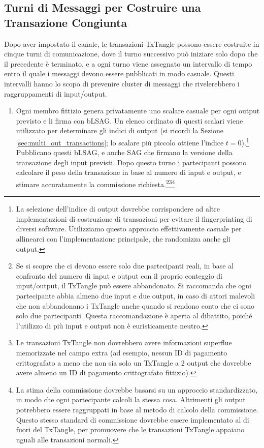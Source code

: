 \subsection{Turni di Messaggi per Costruire una Transazione Congiunta}
\label{subsec:message-rounds-txtangle}

Dopo aver impostato il canale, le transazioni TxTangle possono essere costruite in cinque turni di comunicazione, dove il turno successivo può iniziare solo dopo che il precedente è terminato, e a ogni turno viene assegnato un intervallo di tempo entro il quale i messaggi devono essere pubblicati in modo casuale. Questi intervalli hanno lo scopo di prevenire cluster di messaggi che rivelerebbero i raggruppamenti di input/output.
\begin{enumerate}
    \item Ogni membro fittizio genera privatamente uno scalare casuale per ogni output previsto e li firma con bLSAG. Un elenco ordinato di questi scalari viene utilizzato per determinare gli indici di output (si ricordi la Sezione \ref{sec:multi_out_transactions}; lo scalare più piccolo ottiene l'indice $t = 0$).\footnote{La selezione dell'indice di output dovrebbe corrispondere ad altre implementazioni di costruzione di transazioni per evitare il fingerprinting di diversi software. Utilizziamo questo approccio effettivamente casuale per allinearci con l'implementazione principale, che randomizza anche gli output.} Pubblicano questi bLSAG, e anche SAG che firmano la versione della transazione degli input previsti. Dopo questo turno i partecipanti possono calcolare il peso della transazione in base al numero di input e output, e stimare accuratamente la commissione richiesta.\footnote{Se si scopre che ci devono essere solo due partecipanti reali, in base al confronto del numero di input e output con il proprio conteggio di input/output, il TxTangle può essere abbandonato. Si raccomanda che ogni partecipante abbia almeno due input e due output, in caso di attori malevoli che non abbandonano i TxTangle anche quando si rendono conto che ci sono solo due partecipanti. Questa raccomandazione è aperta al dibattito, poiché l'utilizzo di più input e output non è euristicamente neutro.}\footnote{Le transazioni TxTangle non dovrebbero avere informazioni superflue memorizzate nel campo extra (ad esempio, nessun ID di pagamento crittografato a meno che non sia solo un TxTangle a 2 output che dovrebbe avere almeno un ID di pagamento crittografato fittizio).}\footnote{La stima della commissione dovrebbe basarsi su un approccio standardizzato, in modo che ogni partecipante calcoli la stessa cosa. Altrimenti gli output potrebbero essere raggruppati in base al metodo di calcolo della commissione. Questo stesso standard di commissione dovrebbe essere implementato al di fuori del TxTangle, per promuovere che le transazioni TxTangle appaiano uguali alle transazioni normali.}

\end{enumerate}
